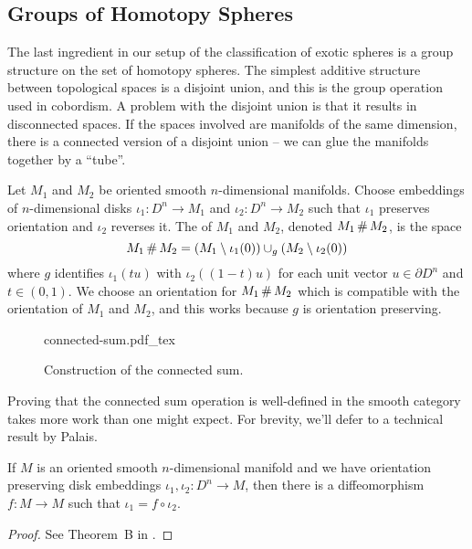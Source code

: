 \subsection{Groups of Homotopy Spheres}

The last ingredient in our setup of the classification of exotic spheres is a group structure on the set of homotopy spheres.
The simplest additive structure between topological spaces is a disjoint union, and this is the group operation used in cobordism. A problem with the disjoint union is that it results in disconnected spaces. If the spaces involved are manifolds of the same dimension, there is a connected version of a disjoint union -- we can glue the manifolds together by a ``tube''.

\begin{definition}
	Let $M_1$ and $M_2$ be oriented smooth $n$-dimensional manifolds. Choose embeddings of $n$-dimensional disks $\iota_1 : D^n \to M_1$ and $\iota_2 : D^n \to M_2$ such that $\iota_1$ preserves orientation and $\iota_2$ reverses it. The  of $M_1$ and $M_2$, denoted $M_1\,\#\, M_2$, is the space
	\[
		M_1\,\#\,M_2 = (M_1 \setminus \iota_1(0))\cup_g (M_2 \setminus \iota_2(0))
	\]
	where $g$ identifies $\iota_1(tu)$ with $\iota_2((1-t)u)$ for each unit vector $u\in \partial D^n$ and $t\in (0,1)$. We choose an orientation for $M_1\,\#\, M_2$ which is compatible with the orientation of $M_1$ and $M_2$, and this works because $g$ is orientation preserving.
\end{definition}

\begin{figure}[ht]
	\centering
	{connected-sum.pdf_tex}
	\caption{Construction of the connected sum.}\label{fig:connected-sum}
\end{figure}

Proving that the connected sum operation is well-defined in the smooth category takes more work than one might expect. For brevity, we'll defer to a technical result by Palais.

\begin{theorem}
	If $M$ is an oriented smooth $n$-dimensional manifold and we have orientation preserving disk embeddings $\iota_1,\iota_2 : D^n \to M$, then there is a diffeomorphism $f : M \to M$ such that $\iota_1 = f\circ \iota_2$.
\end{theorem}
\begin{proof}
	See Theorem~B in \cite{palais1960extending}.
\end{proof}

